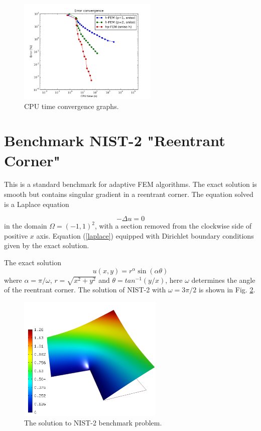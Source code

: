 \documentclass[12pt]{elsarticle}
\begin{document}
\begin{figure}[!ht]
\centering
\includegraphics[height=5cm]{nist/nist-1/conv_cpu_aniso.png}
\vspace{-2mm}
\caption{CPU time convergence graphs.}
\label{fig:nist-1-cpu}
\end{figure}

\section{Benchmark NIST-2 "Reentrant Corner"}
\label{sec:bench-2}

This is a standard benchmark for adaptive FEM algorithms.
The exact solution is smooth but contains singular gradient in a reentrant corner.
The equation solved is a Laplace equation

\begin{equation} \label{laplace}
-\Delta u = 0
\end{equation}
in the domain $\Omega = (-1, 1)^2$, with a section
removed from the clockwise side of positive $x$ axis.
Equation (\ref{laplace}) equipped with Dirichlet
boundary conditions given by the exact solution.

The exact solution
\begin{equation}\label{exact-nist-2}
u(x, y) = r^{\alpha}\sin(\alpha \theta)
\end{equation}
where $\alpha = \pi / \omega$, $r = \sqrt{x^2+y^2}$ and $\theta = tan^{-1}(y/x)$, here $\omega $ determines
the angle of the reentrant corner.
The solution of NIST-2 with $\omega = 3 \pi / 2$  is shown in Fig. \ref{fig:sln-nist02}.

\begin{figure}[!ht]
\centering
\includegraphics[height=6cm]{nist/nist-2/solution.png}
\caption{The solution to NIST-2 benchmark problem.}
\label{fig:sln-nist02}
\end{figure}
\end{document}
